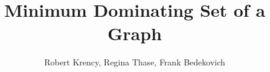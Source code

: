 \documentclass[12pt]{article}
\title{Minimum Dominating Set of a Graph}
\author{Robert Krency, Regina Thase, Frank Bedekovich}
\begin{document}
\maketitle

\vspace{1in}



\pagebreak

\begin{multicols*}{2}
  
  
\end{multicols*}
\end{document}
